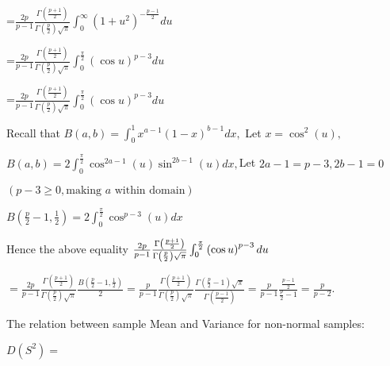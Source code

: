 \documentclass{article}
\begin{document}
=$\frac{2p}{p-1}\frac{\Gamma \left( \frac{p+1}{2}\right) }{\Gamma \left( 
\frac{p}{2}\right) \sqrt{\pi }}\int_{0}^{\infty }\left( 1+u^{2}\right) ^{-%
\frac{p-1}{2}}du$

=$\frac{2p}{p-1}\frac{\Gamma \left( \frac{p+1}{2}\right) }{\Gamma \left( 
\frac{p}{2}\right) \sqrt{\pi }}\int_{0}^{\frac{\pi }{2}}\left( \cos u\right)
^{p-3}du$

=$\frac{2p}{p-1}\frac{\Gamma \left( \frac{p+1}{2}\right) }{\Gamma \left( 
\frac{p}{2}\right) \sqrt{\pi }}\int_{0}^{\frac{\pi }{2}}\left( \cos u\right)
^{p-3}du$

Recall that $B\left( a,b\right) =\int_{0}^{1}x^{a-1}\left( 1-x\right)
^{b-1}dx,$ Let $x=\cos ^{2}\left( u\right) ,$

$B\left( a,b\right) =2\int_{0}^{\frac{\pi }{2}}\cos ^{2a-1}\left( u\right)
\sin ^{2b-1}\left( u\right) dx,$Let $2a-1=p-3,2b-1=0$

$\left( p-3\geq 0,\text{making }a\text{ within domain}\right) $

$B\left( \frac{p}{2}-1,\frac{1}{2}\right) =2\int_{0}^{\frac{\pi }{2}}\cos
^{p-3}\left( u\right) dx$

Hence the above equality $\frac{2p}{p-1}\frac{\Gamma \left( \frac{p+1}{2}%
\right) }{\Gamma \left( \frac{p}{2}\right) \sqrt{\pi }}\int_{0}^{\frac{\pi }{%
2}}\left( \cos u\right) ^{p-3}du$

$=\frac{2p}{p-1}\frac{\Gamma \left( \frac{p+1}{2}\right) }{\Gamma \left( 
\frac{p}{2}\right) \sqrt{\pi }}\frac{B\left( \frac{p}{2}-1,\frac{1}{2}%
\right) }{2}=\frac{p}{p-1}\frac{\Gamma \left( \frac{p+1}{2}\right) }{\Gamma
\left( \frac{p}{2}\right) \sqrt{\pi }}\frac{\Gamma \left( \frac{p}{2}%
-1\right) \sqrt{\pi }}{\Gamma \left( \frac{p-1}{2}\right) }=\frac{p}{p-1}%
\frac{\frac{p-1}{2}}{\frac{p}{2}-1}=\frac{p}{p-2}.$

The relation between sample Mean and Variance for non-normal samples:

$D\left( S^{2}\right) =$
\end{document}

